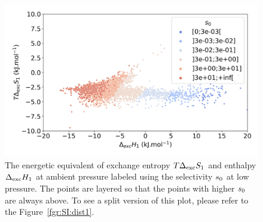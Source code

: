 \documentclass[main.tex]{subfiles}
\begin{document}
\begin{figure}[t]
\centering
  \includegraphics[width=0.6\linewidth]{figures/2-thermo/enthalpy_entropy_2080_s_0.jpg}
  \caption{The energetic equivalent of exchange entropy $T\Delta_{\text{exc}}S_{\text{1}}$ and enthalpy $\Delta_{\text{exc}}H_{\text{1}}$ at ambient pressure labeled using the selectivity $s_{\text{0}}$ at low pressure. The points are layered so that the points with higher $s_{\text{0}}$ are always above. To see a split version of this plot, please refer to the Figure~\ref{fgr:SI:dist1}.}
  \label{fgr:HSplot_1}
\end{figure}
\end{document}
